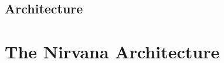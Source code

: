 \subsection{Architecture}
\label{hotos21:architecture}

\newcommand{\REF}{reference}
\newcommand{\PROJECTION}{view}

\section{The Nirvana Architecture}\label{sec:arch}





